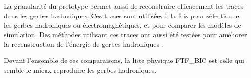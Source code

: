 La granularité du prototype permet aussi de reconstruire efficacement les traces dans les gerbes hadroniques. Ces traces sont utilisées à la fois pour sélectionner les gerbes hadroniques ou électromagnétiques, et pour comparer les modèles de simulation. 
Des méthodes utilisant ces traces ont aussi été testées pour améliorer la reconstruction de l'énergie de gerbes hadroniques \cite{can037-add-b}.

Devant l'ensemble de ces comparaisons, la liste physique FTF\_BIC est celle qui semble le mieux reproduire les gerbes hadroniques.
\newpage
